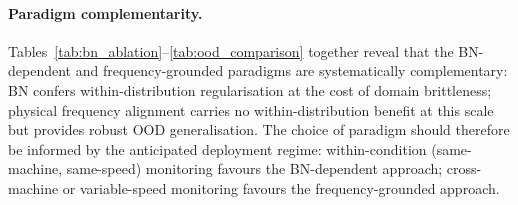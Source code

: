 \paragraph{Paradigm complementarity.}
Tables~\ref{tab:bn_ablation}--\ref{tab:ood_comparison} together reveal that
the BN-dependent and frequency-grounded paradigms are systematically
complementary: BN confers within-distribution regularisation at the cost of
domain brittleness; physical frequency alignment carries no within-distribution
benefit at this scale but provides robust OOD generalisation.
The choice of paradigm should therefore be informed by the anticipated
deployment regime: within-condition (same-machine, same-speed) monitoring
favours the BN-dependent approach; cross-machine or variable-speed monitoring
favours the frequency-grounded approach.
